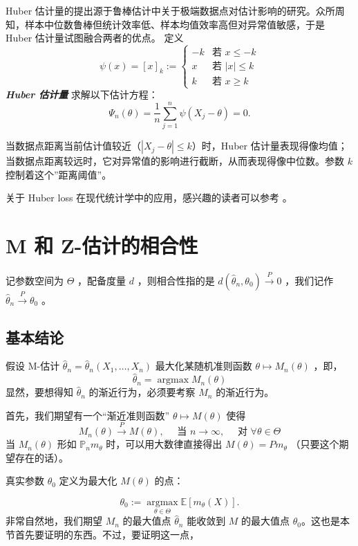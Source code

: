 \begin{example}
Huber 估计量的提出源于鲁棒估计中关于极端数据点对估计影响的研究。众所周知，样本中位数鲁棒但统计效率低、样本均值效率高但对异常值敏感，于是 Huber 估计量试图融合两者的优点。 定义\[\psi(x) = [x]_k := \begin{cases}  -k & \text{若 } x \leq -k \\ x & \text{若 } |x| \leq k \\ k & \text{若 } x \geq k  \end{cases}\]
\textbf{\emph{Huber 估计量}} 求解以下估计方程：
\[
\Psi_n(\theta) = \frac{1}{n}\sum_{j=1}^n \psi(X_j - \theta) = 0.
\]

当数据点距离当前估计值较近（$|X_j- \theta| \leq k$）时，Huber 估计量表现得像均值；当数据点距离较远时，它对异常值的影响进行截断，从而表现得像中位数。参数 $k$ 控制着这个''距离阈值''。

关于 Huber loss 在现代统计学中的应用，感兴趣的读者可以参考 \cite{sunzhoufan2020,hanhuanglinshen2022}。


\end{example}

\section{M 和 Z-估计的相合性}

记参数空间为 $\Theta$ ，配备度量 $d$ ，则相合性指的是 $d(\widehat\theta_n,\theta_0)\overset P\to 0$ ，我们记作 $\widehat\theta_n\overset P\to \theta_0$ 。

\subsection{基本结论}

假设 M-估计 $\widehat\theta_n=\widehat\theta_n(X_1,\dots,X_n)$ 最大化某随机准则函数 $\theta\mapsto M_n(\theta)$ ，即，\[\widehat\theta_n=\operatorname*{\arg\max}M_n(\theta)\]
显然，要想得知 $\widehat\theta_n$ 的渐近行为，必须要考察 $M_n$ 的渐近行为。

首先，我们期望有一个``渐近准则函数'' $\theta\mapsto M(\theta)$ 使得\[M_n(\theta)\overset P\longrightarrow M(\theta),\quad \text{ 当 }n\to\infty,\quad \text{ 对 }\forall \theta\in\Theta\]
当 $M_n(\theta)$ 形如 $\mathbb P_nm_\theta$ 时，可以用大数律直接得出 $M(\theta)=Pm_\theta$ （只要这个期望存在的话）。

真实参数 $\theta_0$ 定义为最大化 $M(\theta)$ 的点：

\[
\theta_0:=\operatorname*{\arg\max}_{\theta\in\Theta}\mathbb E[m_\theta(X)].
\]
非常自然地，我们期望 $M_n$ 的最大值点 $\widehat{\theta}_n$ 能收敛到 $M$ 的最大值点 $\theta_0$。这也是本节首先要证明的东西。不过，要证明这一点，

